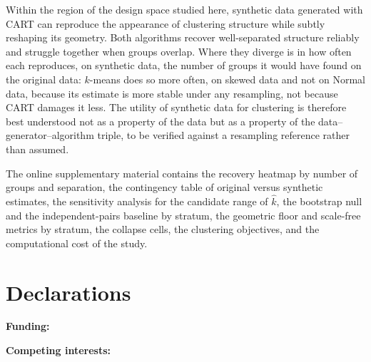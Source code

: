 \documentclass[pdflatex,referee]{sn-jnl}
\begin{document}
Within the region of the design space studied here, synthetic data generated
with CART can reproduce the appearance of clustering structure while subtly
reshaping its geometry. Both algorithms recover well-separated structure
reliably and struggle together when groups overlap. Where they diverge is in
how often each reproduces, on synthetic data, the number of groups it would
have found on the original data: $k$-means does so more often, on skewed data
and not on Normal data, because its estimate is more stable under any
resampling, not because CART damages it less. The utility of synthetic data for
clustering is therefore best understood not as a property of the data but as a
property of the data--generator--algorithm triple, to be verified against a
resampling reference rather than assumed.

\backmatter

The online supplementary material contains the recovery heatmap by number of
groups and separation, the contingency table of original versus synthetic
estimates, the sensitivity analysis for the candidate range of $\hat{k}$, the
bootstrap null and the independent-pairs baseline by stratum, the geometric
floor and scale-free metrics by stratum, the collapse cells, the clustering
objectives, and the computational cost of the study.

\section*{Declarations}

\noindent \textbf{Funding:} 

\noindent \textbf{Competing interests:} 
\end{document}
